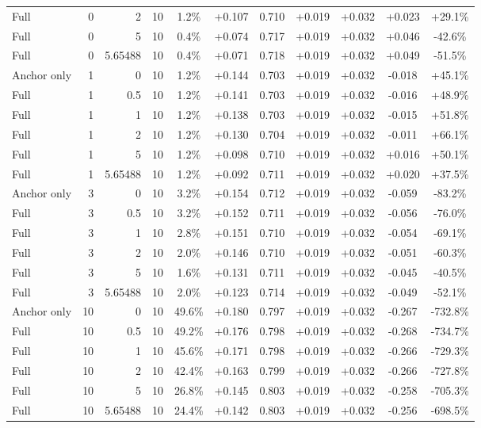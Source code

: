 \begin{table}[htbp]
\begin{tabular}{lrrrccccccc}
Full & 0 & 2 & 10 & 1.2\% & +0.107 & 0.710 & +0.019 & +0.032 & +0.023 & +29.1\% \\
Full & 0 & 5 & 10 & 0.4\% & +0.074 & 0.717 & +0.019 & +0.032 & +0.046 & -42.6\% \\
Full & 0 & 5.65488 & 10 & 0.4\% & +0.071 & 0.718 & +0.019 & +0.032 & +0.049 & -51.5\% \\
Anchor only & 1 & 0 & 10 & 1.2\% & +0.144 & 0.703 & +0.019 & +0.032 & -0.018 & +45.1\% \\
Full & 1 & 0.5 & 10 & 1.2\% & +0.141 & 0.703 & +0.019 & +0.032 & -0.016 & +48.9\% \\
Full & 1 & 1 & 10 & 1.2\% & +0.138 & 0.703 & +0.019 & +0.032 & -0.015 & +51.8\% \\
Full & 1 & 2 & 10 & 1.2\% & +0.130 & 0.704 & +0.019 & +0.032 & -0.011 & +66.1\% \\
Full & 1 & 5 & 10 & 1.2\% & +0.098 & 0.710 & +0.019 & +0.032 & +0.016 & +50.1\% \\
Full & 1 & 5.65488 & 10 & 1.2\% & +0.092 & 0.711 & +0.019 & +0.032 & +0.020 & +37.5\% \\
Anchor only & 3 & 0 & 10 & 3.2\% & +0.154 & 0.712 & +0.019 & +0.032 & -0.059 & -83.2\% \\
Full & 3 & 0.5 & 10 & 3.2\% & +0.152 & 0.711 & +0.019 & +0.032 & -0.056 & -76.0\% \\
Full & 3 & 1 & 10 & 2.8\% & +0.151 & 0.710 & +0.019 & +0.032 & -0.054 & -69.1\% \\
Full & 3 & 2 & 10 & 2.0\% & +0.146 & 0.710 & +0.019 & +0.032 & -0.051 & -60.3\% \\
Full & 3 & 5 & 10 & 1.6\% & +0.131 & 0.711 & +0.019 & +0.032 & -0.045 & -40.5\% \\
Full & 3 & 5.65488 & 10 & 2.0\% & +0.123 & 0.714 & +0.019 & +0.032 & -0.049 & -52.1\% \\
Anchor only & 10 & 0 & 10 & 49.6\% & +0.180 & 0.797 & +0.019 & +0.032 & -0.267 & -732.8\% \\
Full & 10 & 0.5 & 10 & 49.2\% & +0.176 & 0.798 & +0.019 & +0.032 & -0.268 & -734.7\% \\
Full & 10 & 1 & 10 & 45.6\% & +0.171 & 0.798 & +0.019 & +0.032 & -0.266 & -729.3\% \\
Full & 10 & 2 & 10 & 42.4\% & +0.163 & 0.799 & +0.019 & +0.032 & -0.266 & -727.8\% \\
Full & 10 & 5 & 10 & 26.8\% & +0.145 & 0.803 & +0.019 & +0.032 & -0.258 & -705.3\% \\
Full & 10 & 5.65488 & 10 & 24.4\% & +0.142 & 0.803 & +0.019 & +0.032 & -0.256 & -698.5\% \\

\end{tabular}
\end{table}
